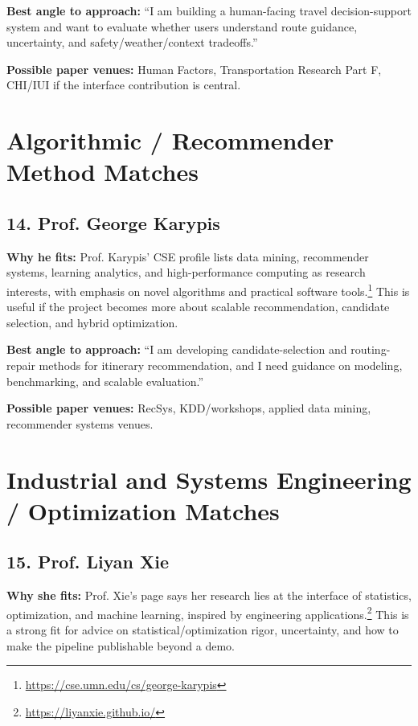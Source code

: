 \documentclass[11pt,a4paper]{article}
\begin{document}
\noindent \textbf{Best angle to approach:} ``I am building a human-facing travel decision-support system and want to evaluate whether users understand route guidance, uncertainty, and safety/weather/context tradeoffs.''

\noindent \textbf{Possible paper venues:} Human Factors, Transportation Research Part F, CHI/IUI if the interface contribution is central.

\section*{Algorithmic / Recommender Method Matches}

\subsection*{14. Prof. George Karypis}

\noindent \textbf{Why he fits:} Prof. Karypis' CSE profile lists data mining, recommender systems, learning analytics, and high-performance computing as research interests, with emphasis on novel algorithms and practical software tools.\footnote{\url{https://cse.umn.edu/cs/george-karypis}} This is useful if the project becomes more about scalable recommendation, candidate selection, and hybrid optimization.

\noindent \textbf{Best angle to approach:} ``I am developing candidate-selection and routing-repair methods for itinerary recommendation, and I need guidance on modeling, benchmarking, and scalable evaluation.''

\noindent \textbf{Possible paper venues:} RecSys, KDD/workshops, applied data mining, recommender systems venues.

\section*{Industrial and Systems Engineering / Optimization Matches}

\subsection*{15. Prof. Liyan Xie}

\noindent \textbf{Why she fits:} Prof. Xie's page says her research lies at the interface of statistics, optimization, and machine learning, inspired by engineering applications.\footnote{\url{https://liyanxie.github.io/}} This is a strong fit for advice on statistical/optimization rigor, uncertainty, and how to make the pipeline publishable beyond a demo.
\end{document}
